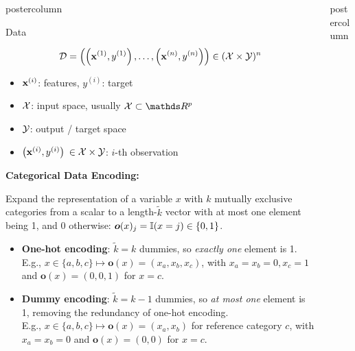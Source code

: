 \documentclass{beamer}
\newlength{\columnheight} %
\begin{document}
\begin{frame}[fragile]{}
\begin{columns}
\begin{column}{.31\textwidth}
\begin{beamercolorbox}[center]{postercolumn}
\begin{minipage}{.98\textwidth}
{\begin{myblock}{Data}

$$\mathcal{D} = \left( \left(\mathbf{x}^{(1)}, y^{(1)}\right), \ldots, \left(\mathbf{x}^{(n)}, y^{(n)}\right)\right) \in (\mathcal{X} \times \mathcal{Y})^n$$
\begin{itemize}[$\bullet$] 
  \setlength{\itemindent}{+.3in}
  \item $\mathbf{x}^{(i)}$: features, $y^{(i)}$: target
  \item $\mathcal{X}$: input space, usually $\Xspace \subset \R^p$
  \item $\mathcal{Y}$: output / target space
  \item \(\left(\mathbf{x}^{(i)}, y^{(i)}\right)\) $\in \mathcal{X}\times \mathcal{Y}$:  \(i\)-th observation
\end{itemize}

\begin{codebox} 
\textbf{Categorical Data Encoding:}
\end{codebox}
Expand the representation of a variable $x$
with $k$ mutually exclusive categories from a scalar 
to a length-$\tilde k$ vector with at most one 
element being 1, and 0 otherwise: $\bm{o}(x)_j =\mathbb{I}(x = j) \in \{0,1\}$.

\begin{itemize}[$\bullet$] 
  \setlength{\itemindent}{+.3in}
    \item \textbf{One-hot encoding}: $\tilde k = k$ dummies, so \textit{exactly 
    one} element is 1. \\
    E.g., $x \in \{ a, b, c\} \mapsto \bm{o}(x) = (x_a, x_b, x_c)$, with 
    $x_a = x_b = 0, x_c = 1$ and $\bm{o}(x) = (0, 0, 1)$ for $x = c$.
    \item \textbf{Dummy encoding}: $\tilde k = k - 1$ dummies, so 
    \textit{at most one} element is 1, removing the redundancy of one-hot 
    encoding. \\
    E.g., $x \in \{ a, b, c\} \mapsto \bm{o}(x) = (x_a, x_b)$ for reference 
    category $c$, with $x_a = x_b = 0$ and $\bm{o}(x) = (0, 0)$ for $x = c$.
\end{itemize} 

\end{myblock}\vfill
				}
			\end{minipage}
		\end{beamercolorbox}
	\end{column}
	

\begin{column}{.31\textwidth}
\begin{beamercolorbox}[center]{postercolumn}
\begin{minipage}{.98\textwidth}
\parbox[t][\columnheight]{\textwidth}{

}
\end{minipage}
\end{beamercolorbox}
\end{column}
\end{columns}
\end{frame}
\end{document}
